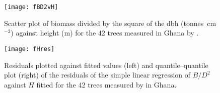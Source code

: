 \begin{figure}[htb]
\begin{center}
\texttt{[image: fBD2vH]}
\end{center}
\caption{Scatter plot of biomass divided by the square of the dbh (tonnes~cm$^{-2}$) against height (m) for the 42 trees measured in Ghana by \citet{henry10}.\label{fBD2vH}}
\end{figure}

\begin{figure}[htb]
\texttt{[image: fHres]}
\caption[Residuals plotted against fitted values and quantile--quantile plot of the residuals of the simple linear regression of $B/D^2$ against $H$ fitted for the 42 trees measured by \textbf{} in Ghana]{Residuals plotted against fitted values (left) and quantile--quantile plot (right) of the residuals of the simple linear regression of $B/D^2$ against $H$ fitted for the 42 trees measured by \textbf{} in Ghana.\label{fHres}}
\end{figure}


